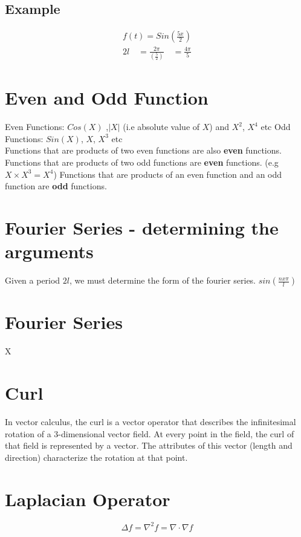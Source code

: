 \documentclass[12pt, a4paper]{article}
\begin{document}
\subsection{Example}
\begin{eqnarray}f(t) = Sin(\frac{5x}{2}) \nonumber\\
2l \quad=\frac{2\pi}{(\frac{5}{2})}\quad = \frac{4\pi}{5}\nonumber
\end{eqnarray}

\section{Even and Odd Function}
Even Functions: $Cos(X)$ ,$|X|$ (i.e absolute value of $X$) and
$X^2$, $X^4$ etc
\newline
Odd Functions: $Sin(X)$, $X$, $X^3$ etc
\\
Functions that are products of two even functions are also
\textbf{even} functions.
\newline
Functions that are products of two odd functions are
\textbf{even} functions. (e.g $X \times X^3 = X^4$)
\newline
Functions that are products of an even function and an
odd function are \textbf{odd} functions.
\section{Fourier Series - determining the arguments}
Given a period $2l$, we must determine the form of the fourier
series. $sin( \frac{n x \pi}{l})$
\section{Fourier Series}
X

\newpage


\section{Curl}
In vector calculus, the curl is a vector operator that describes the infinitesimal rotation of a 3-dimensional vector field. At every point in the field, the curl of that field is represented by a vector. The attributes of this vector (length and direction) characterize the rotation at that point.
\section{Laplacian Operator}
\[\Delta f = \nabla^2 f = \nabla \cdot \nabla f\]
\end{document}
